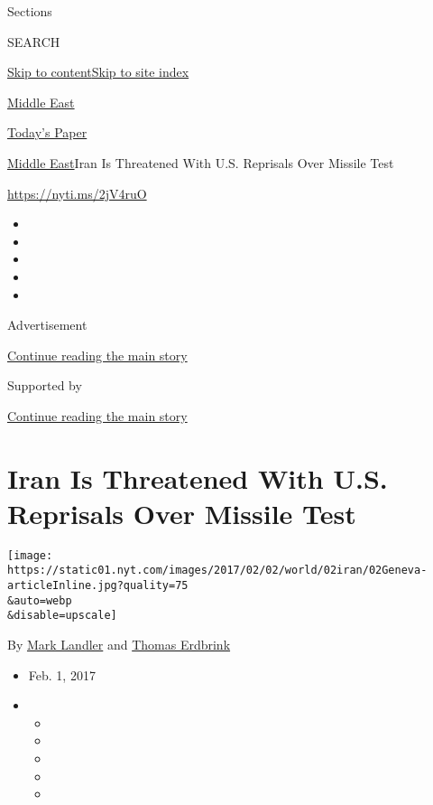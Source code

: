 Sections

SEARCH

\protect\hyperlink{site-content}{Skip to
content}\protect\hyperlink{site-index}{Skip to site index}

\href{https://www.nytimes.com/section/world/middleeast}{Middle East}

\href{https://myaccount.nytimes.com/auth/login?response_type=cookie\&client_id=vi}{}

\href{https://www.nytimes.com/section/todayspaper}{Today's Paper}

\href{/section/world/middleeast}{Middle East}\textbar{}Iran Is
Threatened With U.S. Reprisals Over Missile Test

\url{https://nyti.ms/2jV4ruO}

\begin{itemize}
\item
\item
\item
\item
\item
\end{itemize}

Advertisement

\protect\hyperlink{after-top}{Continue reading the main story}

Supported by

\protect\hyperlink{after-sponsor}{Continue reading the main story}

\hypertarget{iran-is-threatened-with-us-reprisals-over-missile-test}{%
\section{Iran Is Threatened With U.S. Reprisals Over Missile
Test}\label{iran-is-threatened-with-us-reprisals-over-missile-test}}

\texttt{[image: https://static01.nyt.com/images/2017/02/02/world/02iran/02Geneva-articleInline.jpg?quality=75\\\&auto=webp\\\&disable=upscale]}

By \href{http://www.nytimes.com/by/mark-landler}{Mark Landler} and
\href{http://www.nytimes.com/by/thomas-erdbrink}{Thomas Erdbrink}

\begin{itemize}
\item
  Feb. 1, 2017
\item
  \begin{itemize}
  \item
  \item
  \item
  \item
  \item
  \end{itemize}
\end{itemize}

